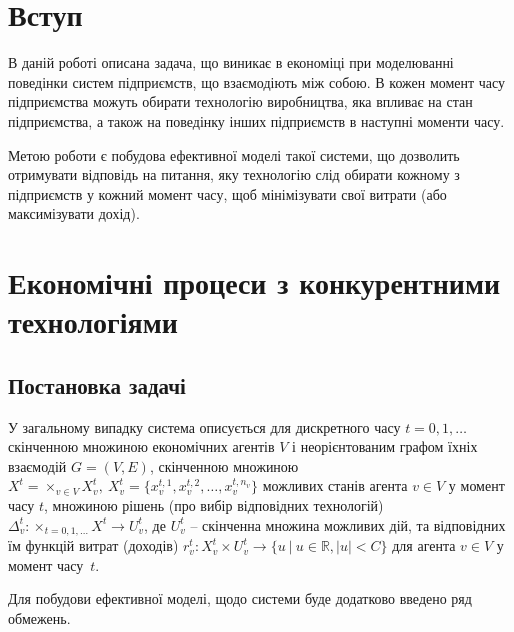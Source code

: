 \documentclass[oneside,draft,14pt]{extarticle}
\begin{document}

\setcounter{page}{2}

\tableofcontents
\clearpage

\section{Вступ}

В даній роботі описана задача, що виникає в економіці\cite{David:1998} при моделюванні поведінки систем підприємств, що взаємодіють між собою. В кожен момент часу підприємства можуть обирати технологію виробництва, яка впливає на стан підприємства, а також на поведінку інших підприємств в наступні моменти часу.

Метою роботи є побудова ефективної моделі такої системи, що дозволить отримувати відповідь на питання, яку технологію слід обирати кожному з підприємств у кожний момент часу, щоб мінімізувати свої витрати (або максимізувати дохід).

\section{Економічні процеси з конкурентними технологіями}

\subsection{Постановка задачі}
\label{sec:description}

У загальному випадку система описується\cite{Chornei:2005} для дискретного часу \(t = 0, 1, \ldots \) скінченною множиною економічних агентів \(V\) і неорієнтованим графом їхніх взаємодій \(G = (V, E)\), скінченною множиною \(X^t = \times_{v \in V}X_v^t,\ X_v^t = \{x^{t,1}_v, x^{t,2}_v, \ldots, x^{t,n_v}_v\}\) можливих станів агента \(v \in V\) у момент часу \(t\), множиною рішень (про вибір відповідних технологій) \(\Delta_v^t: \times_{t=0,1,\ldots}X^t \rightarrow U_v^t\), де \(U_v^t\) – скінченна множина можливих дій, та відповідних їм функцій витрат (доходів) \(r_v^t: X_v^t \times U_v^t \rightarrow \{u\ |\ u \in \mathbb{R}, |u| < C\}\) для агента \(v \in V\) у момент часу~\(t\).


Для побудови ефективної моделі, щодо системи буде додатково введено ряд обмежень.
\end{document}
